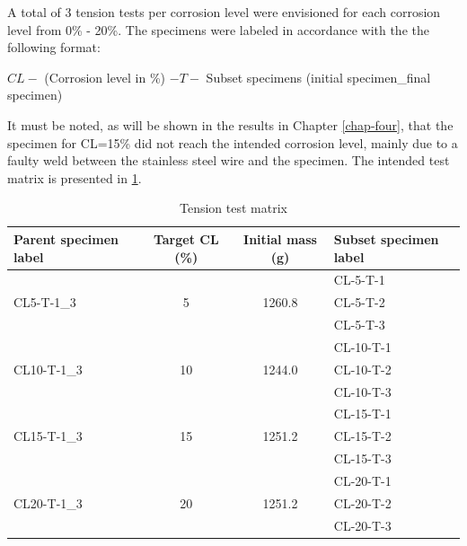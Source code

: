A total of 3 tension tests per corrosion level were envisioned for each corrosion level from 0\% - 20\%. The specimens were labeled in accordance with the the following format:

$CL-$ (Corrosion level in  \%) $-T-$ Subset specimens (initial specimen\_final specimen)

It must be noted, as will be shown in the results in Chapter \ref{chap-four}, that the specimen for CL=15\% did not reach the intended corrosion level, mainly due to a faulty weld between the stainless steel wire and the specimen. The intended test matrix is presented in \ref{tab:tension_matrix}.

\begin{table}[htbp]
\caption{Tension test matrix}
\label{tab:tension_matrix}
\centering
\begin{tabular}{lccl}
Parent specimen label        & Target CL (\%)      & Initial mass (g)        & Subset specimen label \\ \hline
\multirow{3}{*}{CL5-T-1\_3}  & \multirow{3}{*}{5}  & \multirow{3}{*}{1260.8} & CL-5-T-1              \\
                             &                     &                         & CL-5-T-2              \\
                             &                     &                         & CL-5-T-3              \\
\multirow{3}{*}{CL10-T-1\_3} & \multirow{3}{*}{10} & \multirow{3}{*}{1244.0} & CL-10-T-1             \\
                             &                     &                         & CL-10-T-2             \\
                             &                     &                         & CL-10-T-3             \\
\multirow{3}{*}{CL15-T-1\_3\*} & \multirow{3}{*}{15} & \multirow{3}{*}{1251.2} & CL-15-T-1             \\
                             &                     &                         & CL-15-T-2             \\
                             &                     &                         & CL-15-T-3             \\
\multirow{3}{*}{CL20-T-1\_3} & \multirow{3}{*}{20} & \multirow{3}{*}{1251.2} & CL-20-T-1             \\
                             &                     &                         & CL-20-T-2             \\
                             &                     &                         & CL-20-T-3            
\end{tabular}
\end{table}

